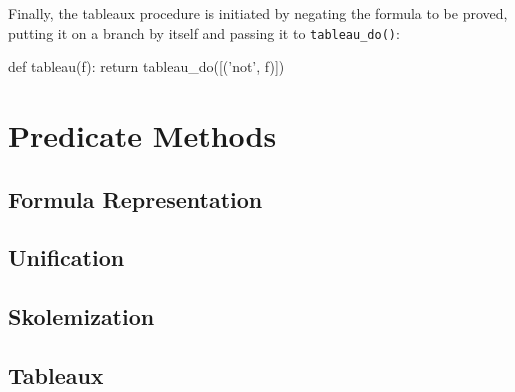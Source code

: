 \documentclass[a4paper,notitlepage]{scrartcl}
\begin{document}
Finally, the tableaux procedure is initiated by negating the formula to be
proved, putting it on a branch by itself and passing it to
\texttt{tableau\_do()}:

\begin{code}
def tableau(f):
    return tableau_do([('not', f)])
\end{code}

\section{Predicate Methods}

\subsection{Formula Representation}

\subsection{Unification}

\subsection{Skolemization}

\subsection{Tableaux}
\end{document}
